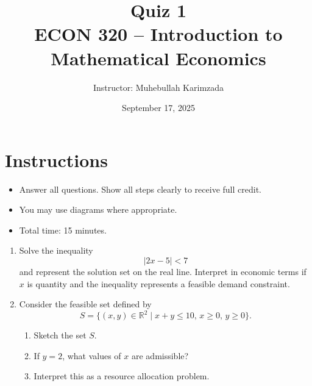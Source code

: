 \documentclass[12pt]{article}
\title{Quiz 1\\ \vspace{10pt}
\large ECON 320 -- Introduction to Mathematical Economics}
\author{Instructor: Muhebullah Karimzada}
\date{September 17, 2025}
\begin{document}
\maketitle

\section*{Instructions}
\begin{itemize}
    \item Answer all questions. Show all steps clearly to receive full credit.
    \item You may use diagrams where appropriate.
    \item Total time: 15 minutes.
\end{itemize}

\hrulefill


\begin{enumerate}[label=\textbf{Q\arabic*.}]
   
    \item Solve the inequality
    \[
    |2x - 5| < 7
    \]
    and represent the solution set on the real line. Interpret in economic terms if $x$ is quantity and the inequality represents a feasible demand constraint.
   

    \item Consider the feasible set defined by
    \[
    S = \{ (x,y) \in \mathbb{R}^2 \mid x + y \leq 10, \, x \geq 0, \, y \geq 0 \}.
    \]
    \begin{enumerate}[label=(\alph*)]
        \item Sketch the set $S$.  
        \item If $y=2$, what values of $x$ are admissible?  
        \item Interpret this as a resource allocation problem.  
    \end{enumerate}
  


\end{enumerate}
\end{document}
